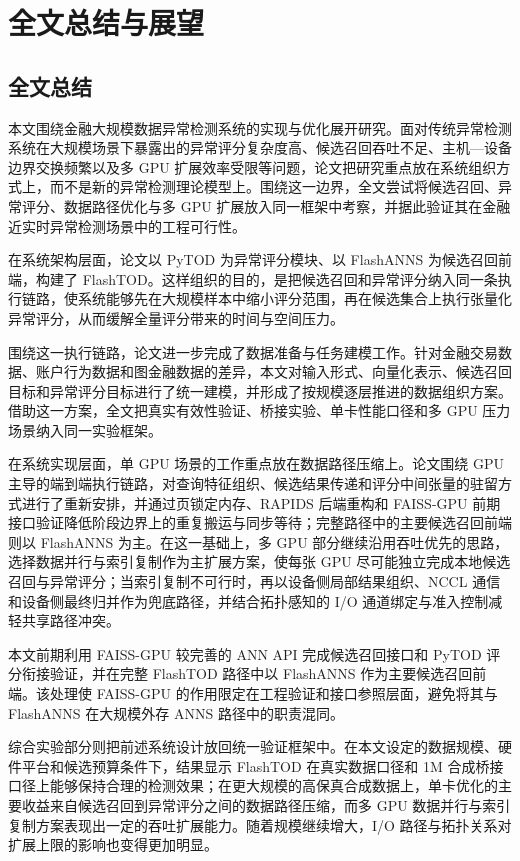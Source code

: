 
\chapter{全文总结与展望}

\section{全文总结}

本文围绕金融大规模数据异常检测系统的实现与优化展开研究。面对传统异常检测系统在大规模场景下暴露出的异常评分复杂度高、候选召回吞吐不足、主机---设备边界交换频繁以及多 GPU 扩展效率受限等问题，论文把研究重点放在系统组织方式上，而不是新的异常检测理论模型上。围绕这一边界，全文尝试将候选召回、异常评分、数据路径优化与多 GPU 扩展放入同一框架中考察，并据此验证其在金融近实时异常检测场景中的工程可行性。

在系统架构层面，论文以 PyTOD 为异常评分模块、以 FlashANNS 为候选召回前端，构建了 FlashTOD。这样组织的目的，是把候选召回和异常评分纳入同一条执行链路，使系统能够先在大规模样本中缩小评分范围，再在候选集合上执行张量化异常评分，从而缓解全量评分带来的时间与空间压力。

围绕这一执行链路，论文进一步完成了数据准备与任务建模工作。针对金融交易数据、账户行为数据和图金融数据的差异，本文对输入形式、向量化表示、候选召回目标和异常评分目标进行了统一建模，并形成了按规模逐层推进的数据组织方案。借助这一方案，全文把真实有效性验证、桥接实验、单卡性能口径和多 GPU 压力场景纳入同一实验框架。

在系统实现层面，单 GPU 场景的工作重点放在数据路径压缩上。论文围绕 GPU 主导的端到端执行链路，对查询特征组织、候选结果传递和评分中间张量的驻留方式进行了重新安排，并通过页锁定内存、RAPIDS 后端重构和 FAISS-GPU 前期接口验证降低阶段边界上的重复搬运与同步等待；完整路径中的主要候选召回前端则以 FlashANNS 为主。在这一基础上，多 GPU 部分继续沿用吞吐优先的思路，选择数据并行与索引复制作为主扩展方案，使每张 GPU 尽可能独立完成本地候选召回与异常评分；当索引复制不可行时，再以设备侧局部结果组织、NCCL 通信和设备侧最终归并作为兜底路径，并结合拓扑感知的 I/O 通道绑定与准入控制减轻共享路径冲突。

本文前期利用 FAISS-GPU 较完善的 ANN API 完成候选召回接口和 PyTOD 评分衔接验证，并在完整 FlashTOD 路径中以 FlashANNS 作为主要候选召回前端。该处理使 FAISS-GPU 的作用限定在工程验证和接口参照层面，避免将其与 FlashANNS 在大规模外存 ANNS 路径中的职责混同。

综合实验部分则把前述系统设计放回统一验证框架中。在本文设定的数据规模、硬件平台和候选预算条件下，结果显示 FlashTOD 在真实数据口径和 1M 合成桥接口径上能够保持合理的检测效果；在更大规模的高保真合成数据上，单卡优化的主要收益来自候选召回到异常评分之间的数据路径压缩，而多 GPU 数据并行与索引复制方案表现出一定的吞吐扩展能力。随着规模继续增大，I/O 路径与拓扑关系对扩展上限的影响也变得更加明显。

